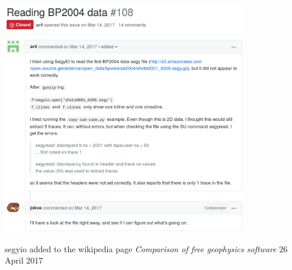 \documentclass[pdf]{beamer}
\begin{document}
\begin{frame}
    \includegraphics[width=0.8\textwidth, keepaspectratio]{img/segyio-feature-issue}
\end{frame}

\begin{frame}
    segyio added to the wikipedia page \emph{Comparison of free geophysics
    software} 26 April 2017
\end{frame}
\end{document}
